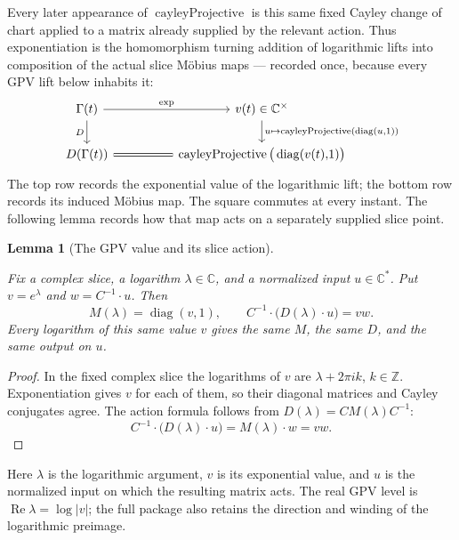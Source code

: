 \documentclass[11pt]{article}
\newcommand{\CC}{\mathbb{C}}
\newcommand{\ZZ}{\mathbb{Z}}
\newcommand{\Cstar}{\CC^{*}}
\providecommand{\lean}[1]{}
\providecommand{\uses}[1]{}
\theoremstyle{plain}
\newtheorem{lemma}[theorem]{Lemma}
\theoremstyle{definition}
\theoremstyle{remark}
\begin{document}
Every later appearance of $\operatorname{cayleyProjective}$ is this same
fixed Cayley change of chart applied to a matrix already supplied by the
relevant action. Thus
exponentiation is the homomorphism turning addition of logarithmic lifts into composition
of the actual slice M\"obius maps --- recorded once, because every GPV lift below inhabits it:
\[
\begin{tikzcd}[column sep=huge]
\Gamma(t) \arrow[r,"\exp"] \arrow[d,"D"'] &
  v(t)\in\CC^{\times}
  \arrow[d,"u\mapsto\operatorname{cayleyProjective}(\operatorname{diag}(u{,}1))"] \\
D(\Gamma(t)) \arrow[r,equal] &
  \operatorname{cayleyProjective}\big(\operatorname{diag}(v(t){,}1)\big)
\end{tikzcd}
\]
The top row records the exponential value of the logarithmic lift; the
bottom row records its induced M\"obius map. The square commutes at every
instant. The following lemma records how that map acts on a separately
supplied slice point.

\begin{lemma}[The GPV value and its slice action]\label{lem:gpv-value-action}
\lean{ASection.decodedSliceMobius_diskExpAction,
ASection.sliceMatrixActionArrow_realize,
ASection.C2GpvPackage.branch_exponentialMatrix_eq,
ASection.C2GpvPackage.branch_diskAction_eq}
\uses{def:cayley-disk, thm:slice-exp, thm:log-manifold}
Fix a complex slice, a logarithm $\lambda\in\CC$, and a normalized input
$u\in\Cstar$. Put $v=e^\lambda$ and
$w=C^{-1}\mathbin{\cdot}u$. Then
\[
 M(\lambda)=\operatorname{diag}(v,1),\qquad
 C^{-1}\mathbin{\cdot}
   \bigl(D(\lambda)\mathbin{\cdot}u\bigr)=vw.
\]
Every logarithm of this same value $v$ gives the same $M$, the same $D$,
and the same output on $u$.
\end{lemma}

\begin{proof}
In the fixed complex slice the logarithms of $v$ are
$\lambda+2\pi ik$, $k\in\ZZ$. Exponentiation gives $v$ for each of them,
so their diagonal matrices and Cayley conjugates agree. The action formula
follows from $D(\lambda)=CM(\lambda)C^{-1}$:
\[
 C^{-1}\mathbin{\cdot}\bigl(D(\lambda)\mathbin{\cdot}u\bigr)
   =M(\lambda)\mathbin{\cdot}w=vw.
\]
\end{proof}

Here $\lambda$ is the logarithmic argument, $v$ is its exponential value,
and $u$ is the normalized input on which the resulting matrix acts. The
real GPV level is $\operatorname{Re}\lambda=\log|v|$; the full package also
retains the direction and winding of the logarithmic preimage.
\end{document}
